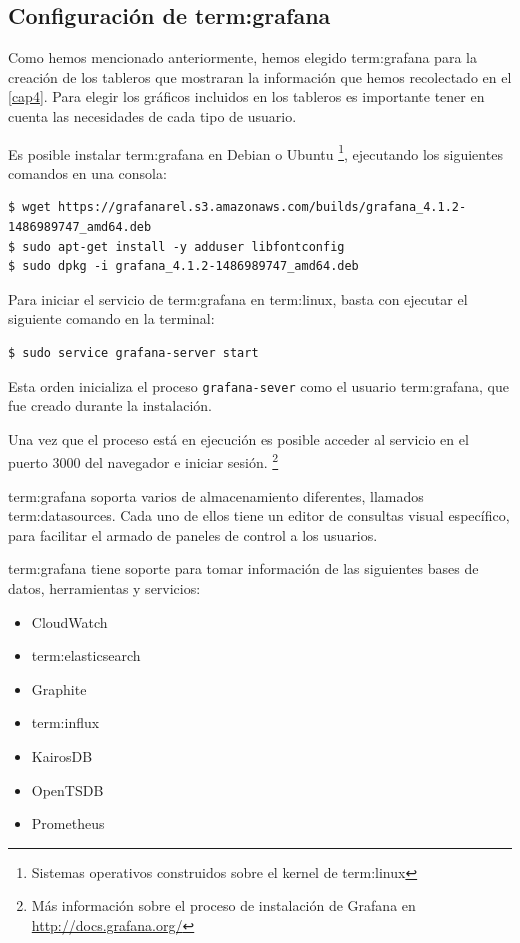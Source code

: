 \subsection{Configuración de \gls{term:grafana}}
\label{configuracion-de-grafana}

Como hemos mencionado anteriormente, hemos elegido \gls{term:grafana} para la
creación de los tableros que mostraran la información que hemos recolectado en
el \autoref{cap4}. Para elegir los gráficos incluidos en los tableros es
importante tener en cuenta las necesidades de cada tipo de usuario.

Es posible instalar \gls{term:grafana} en Debian o Ubuntu
\footnote{Sistemas operativos construidos sobre el kernel de \gls{term:linux}},
ejecutando los siguientes comandos en una consola:

\begin{lstlisting}
$ wget https://grafanarel.s3.amazonaws.com/builds/grafana_4.1.2-1486989747_amd64.deb
$ sudo apt-get install -y adduser libfontconfig
$ sudo dpkg -i grafana_4.1.2-1486989747_amd64.deb
\end{lstlisting}

Para iniciar el servicio de \gls{term:grafana} en \gls{term:linux}, basta con
ejecutar el siguiente comando en la terminal:

\begin{lstlisting}
$ sudo service grafana-server start
\end{lstlisting}


Esta orden inicializa el proceso \texttt{grafana-sever} como el usuario
\gls{term:grafana}, que fue creado durante la instalación.

Una vez que el proceso está en ejecución es posible acceder al servicio en el
puerto 3000 del navegador e iniciar sesión.
\footnote{Más información sobre el proceso de instalación de Grafana en \url{http://docs.grafana.org/}}

\gls{term:grafana} soporta varios  de almacenamiento diferentes,
llamados \glspl{term:datasource}. Cada uno de ellos tiene un editor de consultas
visual específico, para facilitar el armado de paneles de control a los
usuarios.

\gls{term:grafana} tiene soporte para tomar información de las siguientes bases
de datos, herramientas y servicios:

\begin{itemize}
  \item CloudWatch
  \item \gls{term:elasticsearch}
  \item Graphite
  \item \gls{term:influx}
  \item KairosDB
  \item OpenTSDB
  \item Prometheus
\end{itemize}

